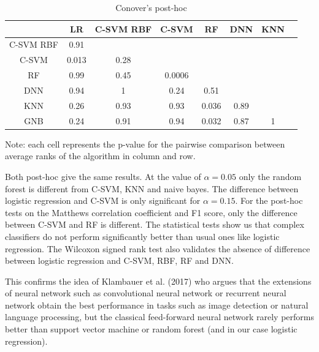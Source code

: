 \documentclass[a4paper,12pt]{article}
\numberwithin{equation}{section}
\begin{document}
\begin{table}[H]
\begin{center}
\caption{Conover's post-hoc}
\begin{threeparttable}
\begin{tabular}{ |c|c|c|c|c|c|c|c| } 
 \hline
  & LR & C-SVM RBF & C-SVM & RF & DNN & KNN  \\ 
 \hline 
 C-SVM RBF & 0.91 & & & & & \\[1pt]
 C-SVM  & 0.013 & 0.28 & & & &  \\[1pt]
 RF & 0.99 & 0.45 & 0.0006 & & & \\[1pt]
 DNN & 0.94 & 1 & 0.24 & 0.51 & & \\[1pt]
 KNN & 0.26 & 0.93 & 0.93 & 0.036 & 0.89 & \\[1pt]
 GNB & 0.24 & 0.91 & 0.94 & 0.032 & 0.87 & 1 \\[1pt]
 \hline

\end{tabular}
\begin{tablenotes}
\small
\item   Note: each cell represents the p-value for the pairwise comparison between average ranks of the algorithm in column and row. 
\end{tablenotes}
\end{threeparttable}
\label{table:7}
\end{center}
\end{table}

Both post-hoc give the same results. At the value of $\alpha = 0.05$ only the random forest is different from C-SVM, KNN and naive bayes. The difference between logistic regression and C-SVM is only significant for $\alpha = 0.15$. For the post-hoc tests on the Matthews correlation coefficient and F1 score, only the difference between C-SVM and RF is different. The statistical tests show us that complex classifiers do not perform significantly better than usual ones like logistic regression. The Wilcoxon signed rank test also validates the absence of difference between logistic regression and C-SVM, RBF, RF and DNN.\par

This confirms the idea of Klambauer et al. (2017) who argues that the extensions of neural network such as convolutional neural network or recurrent neural network obtain the best performance in tasks such as image detection or natural language processing, but the classical feed-forward neural network rarely performs better than support vector machine or random forest (and in our case logistic regression).
\end{document}
